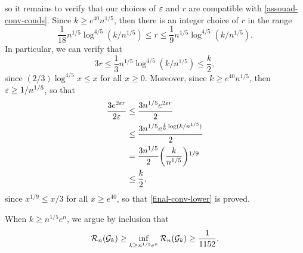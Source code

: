 so it remains to verify that our choices of $\varepsilon$ and $r$ are
compatible with \eqref{assouad-conv-conds}. Since $k \ge e^{40} n^{1/5}$,
then there is an integer choice of $r$ in the range
\[
  \frac{1}{18} n^{1/5} \log^{4/5} (k/n^{1/5}) \le r \le \frac{1}{9} n^{1/5} \log^{4/5} (k/n^{1/5}) .
\]
In particular, we can verify that
\[
  3r \le \frac{1}{3} n^{1/5} \log^{4/5} (k/n^{1/5}) \le \frac{k}{2} ,
\]
since $(2/3) \log^{4/5} x \le x$ for all $x \ge 0$. Moreover, since
$k \ge e^{40} n^{1/5}$, then $\varepsilon \ge 1/n^{1/5}$, so that
\begin{align*}
  \frac{3 e^{2 \eps r}}{2 \eps} &\le \frac{3 n^{1/5} e^{2 \eps r}}{2} \\
                                &\le \frac{3 n^{1/5} e^{\frac{1}{9} \log (k/n^{1/5})}}{2} \\
                                &= \frac{3 n^{1/5}}{2} \left(\frac{k}{n^{1/5}}\right)^{1/9} \\
                                &\le \frac{k}{2} ,
\end{align*}
since $x^{1/9} \le x/3$ for all $x \ge e^{40}$, so that
\eqref{final-conv-lower} is proved.

When $k \ge n^{1/5} e^n$, we argue by inclusion that
\[
  \mathcal{R}_n(\mathcal{G}_k) \ge \inf_{k \ge n^{1/5} e^n} \mathcal{R}_n(\mathcal{G}_k) \ge \frac{1}{1152} .
\]

